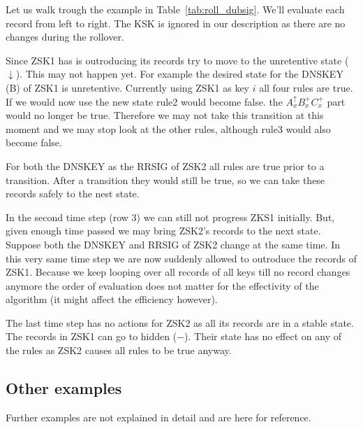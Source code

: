 \documentclass[twoside, a4paper]{article}
\begin{document}
Let us walk trough the example in Table~\ref{tab:roll_dubsig}. We'll 
evaluate each record from left to right. The KSK is ignored in our 
description as there are no changes during the rollover.

Since ZSK1 has is outroducing its records try to move to the 
unretentive state ($\downarrow$). This may not happen yet. For 
example the desired state for the DNSKEY (B) of ZSK1 is unretentive. 
Currently using ZSK1 as key $i$ all four rules are true. If we would 
now use the new state rule2 would become false.  the 
$A_{x}^{\uparrow}B_{x}^{+} C_{x}^{+}$ part would no longer be true.
Therefore we may not take this transition at this moment and we may
stop look at the other rules, although rule3 would also become false.

For both the DNSKEY as the RRSIG of ZSK2 all rules are true prior to 
a transition. After a transition they would still be true, so we can 
take these records safely to the nest state.

In the second time step (row 3) we can still not progress ZKS1 
initially. But, given enough time passed we may bring ZSK2's records 
to the next state. Suppose both the DNSKEY and RRSIG of ZSK2 change 
at the same time. In this very same time step we are now suddenly 
allowed to outroduce the records of ZSK1. Because we keep looping 
over all records of all keys till no record changes anymore the 
order of evaluation does not matter for the effectivity of the 
algorithm (it might affect the efficiency however).

The last time step has no actions for ZSK2 as all its records are in 
a stable state. The records in ZSK1 can go to hidden ($-$). Their 
state has no effect on any of the rules as ZSK2 causes all rules to 
be true anyway.

\subsection{Other examples}

Further examples are not explained in detail and are here for reference.
\end{document}
